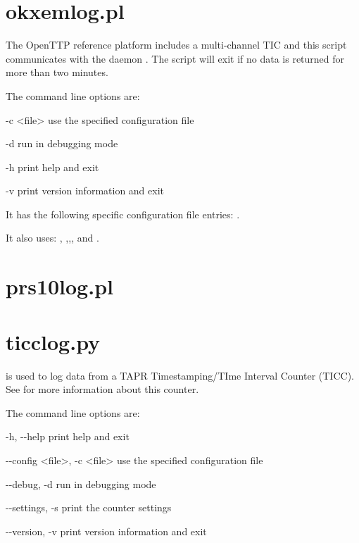 \section{okxemlog.pl}
\hypertarget{h:okxemlog}{}
The OpenTTP reference platform includes a multi-channel TIC and this script communicates with the daemon
. The script will exit if no data is returned for more than two minutes.

The command line options are:
\begin{description*}
	\item[-c \textless file\textgreater] use the specified configuration file
	\item[-d]	run in debugging mode
	\item[-h]	print help and exit
	\item[-v]	print version information and exit
\end{description*}

It has the following specific configuration file entries:
.

It also uses: ,
,,, and 
.

\section{prs10log.pl}
\hypertarget{h:prs10log}{}

\section{ticclog.py}
\hypertarget{h:ticclog}{}

 is used to log data from a TAPR Timestamping/TIme Interval Counter (TICC).
See  for more information about this counter.

The command line options are:
\begin{description*}
 \item[-h, -{}-help] print help and exit
 \item[-{}-config \textless file\textgreater, -c \textless file\textgreater] use the specified configuration file
 \item[-{}-debug, -d]           run in debugging mode
 \item[-{}-settings, -s]        print the counter settings
  \item[-{}-version, -v]        	print version information and exit
\end{description*}

